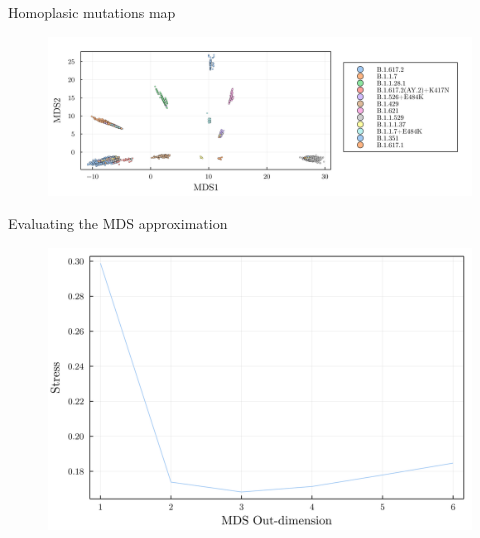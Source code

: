 \documentclass{beamer}
\begin{document}
\begin{frame}{Homoplasic mutations map}
    \begin{figure}
        \includegraphics[width=\textwidth]{my_figs/homoplasy_usa_multidimensional_scaling.png}
    \end{figure}
\end{frame}


\begin{frame}{Evaluating the MDS approximation}
    \begin{figure}
        \includegraphics[width=\textwidth]{my_figs/usa_mds_stress.png}
    \end{figure}
\end{frame}
\end{document}
